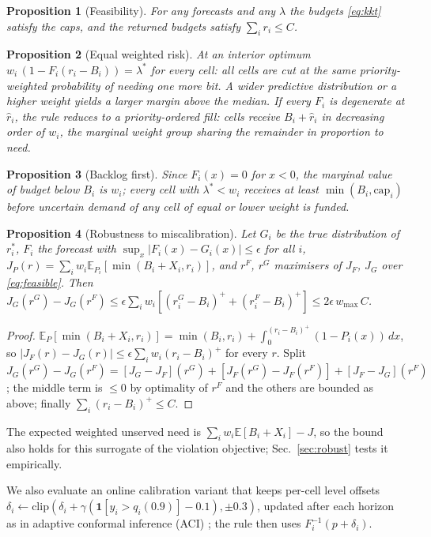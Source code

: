 \documentclass[conference]{IEEEtran}
\newtheorem{proposition}{Proposition}
\begin{document}
\begin{proposition}[Feasibility]
For any forecasts and any $\lambda$ the budgets \eqref{eq:kkt} satisfy the caps, and the returned budgets satisfy $\sum_i r_i \le C$.
\end{proposition}
\begin{proposition}[Equal weighted risk]
At an interior optimum $w_i\,(1 - F_i(r_i - B_i)) = \lambda^\ast$ for every cell: all cells are cut at the same priority-weighted probability of needing one more bit. A wider predictive distribution or a higher weight yields a larger margin above the median. If every $F_i$ is degenerate at $\hat r_i$, the rule reduces to a priority-ordered fill: cells receive $B_i + \hat r_i$ in decreasing order of $w_i$, the marginal weight group sharing the remainder in proportion to need.
\end{proposition}
\begin{proposition}[Backlog first]
Since $F_i(x) = 0$ for $x < 0$, the marginal value of budget below $B_i$ is $w_i$; every cell with $\lambda^\ast < w_i$ receives at least $\min(B_i, \mathrm{cap}_i)$ before uncertain demand of any cell of equal or lower weight is funded.
\end{proposition}
\begin{proposition}[Robustness to miscalibration]
\label{prop:robust}
Let $G_i$ be the true distribution of $r^\ast_i$, $F_i$ the forecast with $\sup_x |F_i(x) - G_i(x)| \le \epsilon$ for all $i$, $J_P(r) = \sum_i w_i \mathbb{E}_{P_i}[\min(B_i + X_i, r_i)]$, and $r^F$, $r^G$ maximisers of $J_F$, $J_G$ over \eqref{eq:feasible}. Then
$J_G(r^G) - J_G(r^F) \le \epsilon \sum_i w_i [(r^G_i - B_i)^+ + (r^F_i - B_i)^+] \le 2\epsilon\, w_{\max}\, C$.
\end{proposition}
\begin{proof}
$\mathbb{E}_{P}[\min(B_i + X_i, r_i)] = \min(B_i, r_i) + \int_0^{(r_i - B_i)^+} (1 - P_i(x))\,dx$, so $|J_F(r) - J_G(r)| \le \epsilon \sum_i w_i (r_i - B_i)^+$ for every $r$. Split $J_G(r^G) - J_G(r^F) = [J_G - J_F](r^G) + [J_F(r^G) - J_F(r^F)] + [J_F - J_G](r^F)$; the middle term is $\le 0$ by optimality of $r^F$ and the others are bounded as above; finally $\sum_i (r_i - B_i)^+ \le C$.
\end{proof}
The expected weighted unserved need is $\sum_i w_i \mathbb{E}[B_i + X_i] - J$, so the bound also holds for this surrogate of the violation objective; Sec.~\ref{sec:robust} tests it empirically.

We also evaluate an online calibration variant that keeps per-cell level offsets $\delta_i \leftarrow \mathrm{clip}(\delta_i + \gamma(\mathbf{1}[y_i > q_i(0.9)] - 0.1), \pm 0.3)$, updated after each horizon as in adaptive conformal inference (ACI) \cite{gibbs2021}; the rule then uses $F_i^{-1}(p + \delta_i)$.
\end{document}
